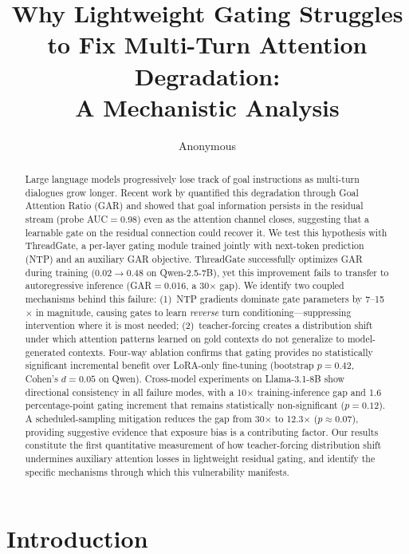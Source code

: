 \documentclass[11pt]{article}
\title{Why Lightweight Gating Struggles to Fix Multi-Turn Attention Degradation:\\A Mechanistic Analysis}
\author{Anonymous}
\begin{document}
\maketitle

\begin{abstract}
Large language models progressively lose track of goal instructions as multi-turn dialogues grow longer.
Recent work by \citet{dongre2026multi} quantified this degradation through Goal Attention Ratio (GAR) and showed that goal information persists in the residual stream (probe AUC$=$0.98) even as the attention channel closes, suggesting that a learnable gate on the residual connection could recover it.
We test this hypothesis with ThreadGate, a per-layer gating module trained jointly with next-token prediction (NTP) and an auxiliary GAR objective.
ThreadGate successfully optimizes GAR during training (0.02$\to$0.48 on Qwen-2.5-7B), yet this improvement fails to transfer to autoregressive inference (GAR$=$0.016, a 30$\times$ gap).
We identify two coupled mechanisms behind this failure:
(1)~NTP gradients dominate gate parameters by 7--15$\times$ in magnitude, causing gates to learn \emph{reverse} turn conditioning---suppressing intervention where it is most needed;
(2)~teacher-forcing creates a distribution shift under which attention patterns learned on gold contexts do not generalize to model-generated contexts.
Four-way ablation confirms that gating provides no statistically significant incremental benefit over LoRA-only fine-tuning (bootstrap $p{=}0.42$, Cohen's $d{=}0.05$ on Qwen).
Cross-model experiments on Llama-3.1-8B show directional consistency in all failure modes, with a 10$\times$ training-inference gap and 1.6 percentage-point gating increment that remains statistically non-significant ($p{=}0.12$).
A scheduled-sampling mitigation reduces the gap from 30$\times$ to 12.3$\times$ ($p{\approx}0.07$), providing suggestive evidence that exposure bias is a contributing factor.
Our results constitute the first quantitative measurement of how teacher-forcing distribution shift undermines auxiliary attention losses in lightweight residual gating, and identify the specific mechanisms through which this vulnerability manifests.
\end{abstract}

\section{Introduction}
\end{document}
